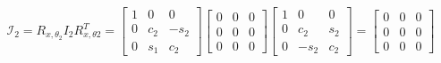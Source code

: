 \documentclass[12pt,norsk,a4paper]{article}
\begin{document}
    \[\mathcal{I}_2 = R_{x,\theta_2}I_2R_{x,\theta2}^T 
    = \left[\begin{array}{ccc}
        1 & 0 & 0\\
        0 & c_2 & -s_2\\
        0 & s_1 & c_2
    \end{array}\right]\left[\begin{array}{ccc}
        0 & 0 & 0\\
        0 & 0 & 0\\
        0 & 0 & 0
    \end{array}\right]\left[\begin{array}{ccc}
        1 & 0 & 0\\
        0 & c_2 & s_2\\
        0 & -s_2 & c_2
    \end{array}\right]
    = \left[\begin{array}{ccc}
        0 & 0 & 0\\
        0 & 0 & 0\\
        0 & 0 & 0
    \end{array}\right]\]
\end{document}
